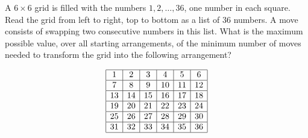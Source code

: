 A $6\times6$ grid is filled with the numbers $1,2,\ldots,36$, one number in each square. Read the grid from left to right, top to bottom as a list of $36$ numbers. A move consists of swapping two consecutive numbers in this list. What is the maximum possible value, over all starting arrangements, of the minimum number of moves needed to transform the grid into the following arrangement?

\[
\begin{array}{|c|c|c|c|c|c|}
\hline
1 & 2 & 3 & 4 & 5 & 6\\
\hline
7 & 8 & 9 & 10 & 11 & 12\\
\hline
13 & 14 & 15 & 16 & 17 & 18\\
\hline
19 & 20 & 21 & 22 & 23 & 24\\
\hline
25 & 26 & 27 & 28 & 29 & 30\\
\hline
31 & 32 & 33 & 34 & 35 & 36\\
\hline
\end{array}
\]
